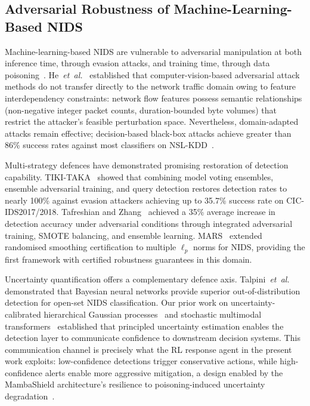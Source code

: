 \documentclass[journal]{IEEEtran}
\theoremstyle{definition}
\theoremstyle{remark}
\begin{document}
\subsection{Adversarial Robustness of Machine-Learning-Based NIDS}
\label{subsec:adv_related}

Machine-learning-based NIDS are vulnerable to adversarial manipulation at both inference time, through evasion attacks, and training time, through data poisoning~\cite{he2023advsurvey}. He~\textit{et~al.}~\cite{he2023advsurvey} established that computer-vision-based adversarial attack methods do not transfer directly to the network traffic domain owing to feature interdependency constraints: network flow features possess semantic relationships (non-negative integer packet counts, duration-bounded byte volumes) that restrict the attacker's feasible perturbation space. Nevertheless, domain-adapted attacks remain effective; decision-based black-box attacks achieve greater than 86\% success rates against most classifiers on NSL-KDD~\cite{sharma2024blackbox}.

Multi-strategy defences have demonstrated promising restoration of detection capability. TIKI-TAKA~\cite{zhang2022tikitaka} showed that combining model voting ensembles, ensemble adversarial training, and query detection restores detection rates to nearly 100\% against evasion attackers achieving up to 35.7\% success rate on CIC-IDS2017/2018. Tafreshian and Zhang~\cite{tafreshian2025defence} achieved a 35\% average increase in detection accuracy under adversarial conditions through integrated adversarial training, SMOTE balancing, and ensemble learning. MARS~\cite{mars2025} extended randomised smoothing certification to multiple $\ell_p$ norms for NIDS, providing the first framework with certified robustness guarantees in this domain.

Uncertainty quantification offers a complementary defence axis. Talpini~\textit{et~al.}~\cite{talpini2024uq} demonstrated that Bayesian neural networks provide superior out-of-distribution detection for open-set NIDS classification. Our prior work on uncertainty-calibrated hierarchical Gaussian processes~\cite{anaedevha2026gp} and stochastic multimodal transformers~\cite{anaedevha2026stochastic} established that principled uncertainty estimation enables the detection layer to communicate confidence to downstream decision systems. This communication channel is precisely what the RL response agent in the present work exploits: low-confidence detections trigger conservative actions, while high-confidence alerts enable more aggressive mitigation, a design enabled by the MambaShield architecture's resilience to poisoning-induced uncertainty degradation~\cite{anaedevha2026mambashield}.
\end{document}
